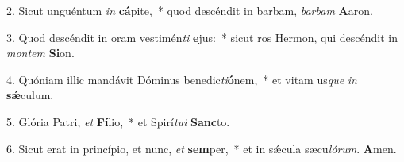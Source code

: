 2. Sicut unguéntum \textit{in} \textbf{cá}pite,~*  quod descéndit in barbam, \textit{bar}\textit{bam} \textbf{A}aron.\

3. Quod descéndit in oram vestimén\textit{ti} \textbf{e}jus:~*  sicut ros Hermon, qui descéndit in \textit{mon}\textit{tem} \textbf{Si}on.\

4. Quóniam illic mandávit Dóminus benedic\textit{ti}\textbf{ó}nem,~*  et vitam us\textit{que} \textit{in} \textbf{sǽ}culum.\

5. Glória Patri, \textit{et} \textbf{Fí}lio,~*  et Spirí\textit{tu}\textit{i} \textbf{Sanc}to.\

6. Sicut erat in princípio, et nunc, \textit{et} \textbf{sem}per,~*  et in sǽcula sæcu\textit{ló}\textit{rum}. \textbf{A}men.\

